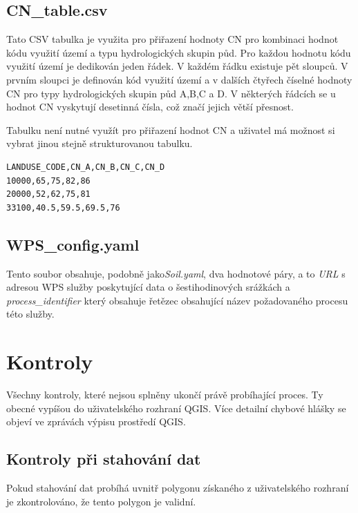 \documentclass[a4paper,oneside,12pt]{book}
\begin{document}
\subsection{CN\_table.csv} \label{CN_table.csv}
\hspace{10mm} Tato CSV tabulka je využita pro přiřazení hodnoty CN pro kombinaci hodnot kódu využití území a typu hydrologických skupin půd. Pro každou hodnotu kódu využití území je dedikován jeden řádek. V každém řádku existuje pět sloupců. V prvním sloupci je definován kód využití území a v dalších čtyřech číselné hodnoty CN pro typy hydrologických skupin půd A,B,C a D. V některých řádcích se u hodnot CN vyskytují desetinná čísla, což značí jejich větší přesnost.

\hspace{10mm} Tabulku není nutné využít pro přiřazení hodnot CN a uživatel má možnost si vybrat jinou stejně strukturovanou tabulku.


\begin{lstlisting}[style=mypython, caption={Ukázka CN\_table.csv},label={kod:CN_table.csv}]
LANDUSE_CODE,CN_A,CN_B,CN_C,CN_D
10000,65,75,82,86
20000,52,62,75,81
33100,40.5,59.5,69.5,76
\end{lstlisting}

\subsection{WPS\_config.yaml} \label{WPS_config.yaml}
\hspace{10mm} Tento soubor obsahuje, podobně jako\textit{Soil.yaml}, dva hodnotové páry, a to \textit{URL} s adresou WPS služby poskytující data o šestihodinových srážkách a \textit{process\_identifier} který obsahuje řetězec obsahující název požadovaného procesu této služby.

\section{Kontroly} \label{checks}
\hspace{10mm} Všechny kontroly, které nejsou splněny ukončí právě probíhající proces. Ty obecné vypíšou do uživatelského rozhraní QGIS. Více detailní chybové hlášky se objeví ve zprávách výpisu prostředí QGIS.

\subsection{Kontroly při stahování dat} \label{download_checks}
\hspace{10mm} Pokud stahování dat probíhá uvnitř polygonu získaného z uživatelského rozhraní je zkontrolováno, že tento polygon je validní.
\end{document}
